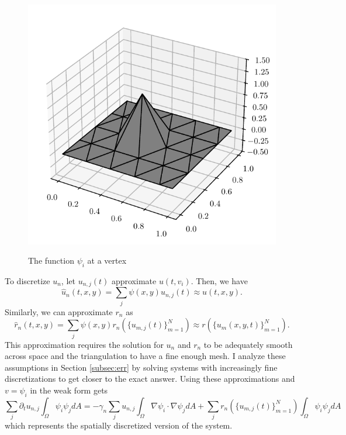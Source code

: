 \begin{figure}[t!]
    \centering
    \caption{The function $\psi_i$ at a vertex}
    \includegraphics{figures/psi.pdf}
    \label{fig:psi}
\end{figure}

To discretize $u_n$, let $u_{n, j} (t)$ approximate $u(t, v_i)$. Then, we have
\[
    \hat{u}_n (t, x, y) = \sum_j \psi(x, y) u_{n, j} (t) \approx u(t, x, y).
\]
Similarly, we can approximate $r_n$ as
\[
    \hat{r}_n (t, x, y) = \sum_j \psi(x, y) r_n \left(\{u_{m, j} (t)\}_{m = 1}^N\right) \approx r(\{u_{m} (x, y, t)\}_{m = 1}^N).
\]
This approximation requires the solution for $u_n$ and $r_n$ to be adequately smooth across space and the triangulation to have a fine enough mesh. I analyze these assumptions in Section \ref{subsec:err} by solving systems with increasingly fine discretizations to get closer to the exact answer. Using these approximations and $v = \psi_i$ in the weak form gets
\[
    \sum_j \partial_t u_{n, j} \int_\Omega \psi_i \psi_j dA = -\gamma_n \sum_j u_{n, j} \int_\Omega \nabla \psi_i \cdot \nabla \psi_j dA + \sum_j r_n \left(\{u_{m, j} (t)\}_{m = 1}^N\right) \int_\Omega \psi_i \psi_j dA
\]
which represents the spatially discretized version of the system.


